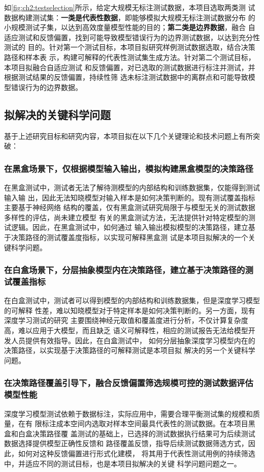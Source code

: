 如\cref{fig:ch2:testselection}所示，给定大规模无标注测试数据，{本项目选取两类测
试数据构建测试集：\textbf{一类是代表性数据}，即能够模拟大规模无标注测试数据分布
的小规模测试子集，以达到高效度量模型性能的目的；\textbf{第二类是边界数据}，融合
自适应测试和反馈偏置，找到可能导致模型错误行为的边界测试数据，以达到充分性测试的
目的}。针对第一个测试目标，本项目拟研究样例测试数据选取，结合决策路径和样本表
示，构建可解释的代表性测试集生成方法。针对第二个测试目标，本项目拟融合自适应测试
和反馈偏置，对已选取的测试数据进行标注并测试，并根据测试结果的反馈偏置，持续性筛
选未标注测试数据中的离群点和可能导致模型错误行为的边界数据。






\subsection{拟解决的关键科学问题}

基于上述研究目标和研究内容，本项目拟在以下几个关键理论和技术问题上有所突破：

\subsubsection{在黑盒场景下，仅根据模型输入输出，模拟构建黑盒模型的决策路径}

在黑盒测试中，测试者无法了解待测模型的内部结构和训练数据集，仅能得到测试输入输
出，因此无法知晓模型对输入样本是如何决策判断的。现有测试覆盖指标主要基于神经网络
结构的覆盖，仅有黑盒测试研究局限于与模型无关的测试数据多样性的评估，尚未建立模型
有关的黑盒测试方法，无法提供针对特定模型的测试逻辑。因此，在黑盒测试中，如何通过
输入输出模拟模型的决策路径，建立基于决策路径的测试覆盖度指标，以实现可解释黑盒测
试是本项目拟解决的一个关键科学问题。


\subsubsection{在白盒场景下，分层抽象模型内在决策路径，建立基于决策路径的测试覆盖指标}

在白盒测试中，测试者可以得到模型的内部结构和训练数据集，但是深度学习模型的可解释
性差，难以知晓模型对于特定样本是如何决策判断的。另一方面，现有深度学习测试的研究
主要围绕神经元取值和覆盖度进行分析，不仅计算复杂度高，难以应用于大模型，而且缺乏
语义可解释性，相应的测试报告无法给模型开发人员提供有效指导。因此，在白盒测试中，
如何分层抽象深度学习模型内在的决策路径，以实现基于决策路径的可解释测试是本项目拟
解决的另一个关键科学问题。

\subsubsection{在决策路径覆盖引导下，融合反馈偏置筛选规模可控的测试数据评估模型性能}

深度学习模型测试依赖于数据标注，实际应用中，需要合理平衡测试集的规模和质量，在有
限标注成本空间内选取对样本空间最具代表性的测试数据。在本项目黑盒和白盒决策路径覆
盖测试的基础上，已选择的测试数据执行结果可为后续测试数据选择提供模型正确性反馈和
路径覆盖反馈，指导后续测试数据筛选方式，因此，如何对这种反馈偏置进行形式化建模，
将其用于代表性测试用例的持续筛选中，并适应不同的测试目标，也是本项目拟解决的关键
科学问题问题之一。